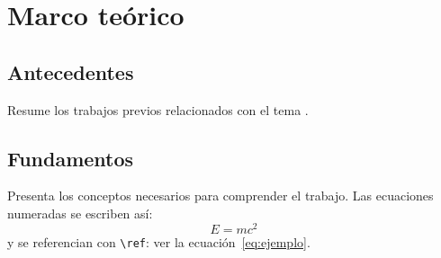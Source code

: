 \chapter{Marco teórico}
\label{cap:marco-teorico}

\section{Antecedentes}
Resume los trabajos previos relacionados con el tema \cite{lamport1994}.

\section{Fundamentos}
Presenta los conceptos necesarios para comprender el trabajo. Las ecuaciones numeradas
se escriben así:
\begin{equation}
  \label{eq:ejemplo}
  E = m c^2
\end{equation}
y se referencian con \verb|\ref|: ver la ecuación~\eqref{eq:ejemplo}.
